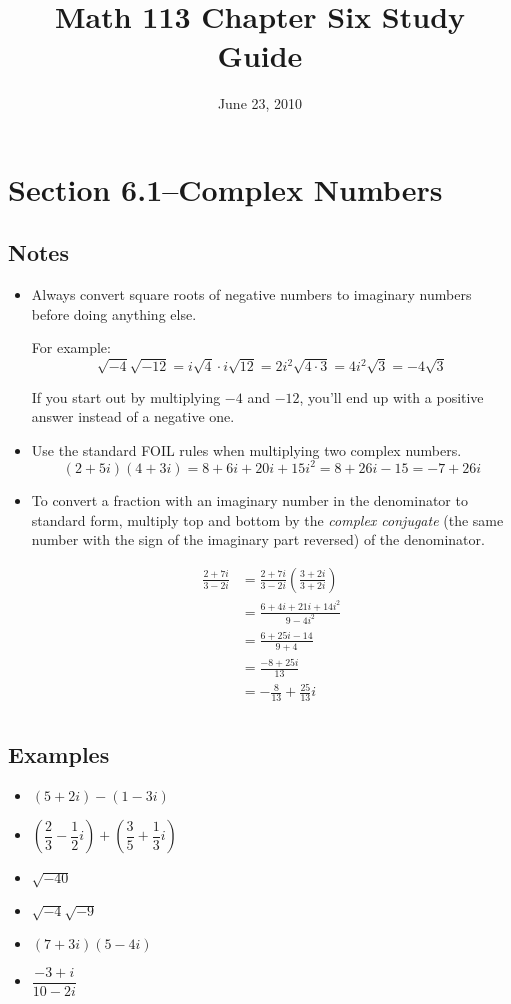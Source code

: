 \documentclass[fleqn,addpoints]{exam}
\title{Math 113 Chapter Six Study Guide}
\author{}
\date{June 23, 2010}
\begin{document}
\maketitle

\section{Section 6.1--Complex Numbers}

\subsection{Notes}

\begin{itemize}
\item
Always convert square roots of negative numbers to imaginary numbers before doing anything else.  

For example:
\[
  \sqrt{-4} \sqrt{-12} = i\sqrt{4} \cdot i\sqrt{12} = 2i^2 \sqrt{4 \cdot 3} = 4i^2 \sqrt{3} = -4 \sqrt{3}
\]

If you start out by multiplying $-4$ and $-12$, you'll end up with a positive answer instead of a negative one.

\item
Use the standard FOIL rules when multiplying two complex numbers.
\[
  (2 + 5i)(4 + 3i) = 8 + 6i + 20i + 15i^2 = 8 + 26i - 15 = -7 + 26i
\]

\item
  To convert a fraction with an imaginary number in the denominator to standard form, multiply top and bottom by the
  {\em complex conjugate} (the same number with the sign of the imaginary part reversed) of the denominator.

\begin{align*}
  \frac{2+7i}{3-2i} &= \frac{2+7i}{3-2i} \left( \frac{3+2i}{3+2i} \right) \\
  &= \frac{6 + 4i + 21i + 14i^2}{9 - 4i^2} \\
  &= \frac{6 + 25i - 14}{9 + 4} \\
  &= \frac{-8 + 25i}{13} \\
  &= - \frac{8}{13} + \frac{25}{13}i \\
\end{align*}

\end{itemize}

\subsection{Examples}
\begin{itemize}
  \item $(5+2i) - (1 - 3i)$
  \item $(\dfrac{2}{3}-\dfrac{1}{2}i) + (\dfrac{3}{5} + \dfrac{1}{3} i)$
  \item $\sqrt{-40}$
  \item $\sqrt{-4} \sqrt{-9}$
  \item $(7+3i) (5 - 4i)$
  \item $\dfrac{-3+i}{10-2i}$
\end{itemize}
\end{document}
